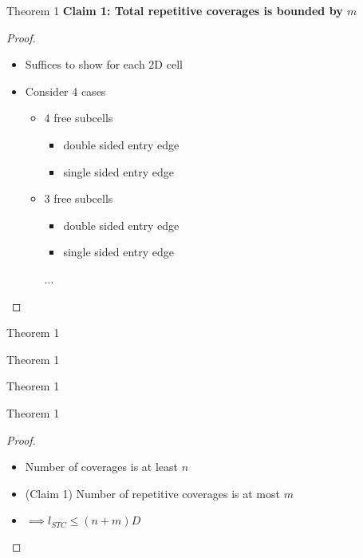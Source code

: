 \documentclass{beamer}
\begin{document}
\begin{frame}{Theorem 1}
    \textbf{Claim 1: Total repetitive coverages is bounded by $m$}
    \begin{proof}
        \begin{itemize}
            \item Suffices to show for each 2D cell
            \item Consider 4 cases
                  \begin{itemize}
                      \item 4 free subcells
                            \begin{itemize}
                                \item double sided entry edge
                                \item single sided entry edge
                            \end{itemize}
                      \item 3 free subcells
                            \begin{itemize}
                                \item double sided entry edge
                                \item single sided entry edge
                            \end{itemize}
                            ...
                  \end{itemize}
        \end{itemize}
    \end{proof}
\end{frame}

\begin{frame}{Theorem 1}
\end{frame}
\begin{frame}{Theorem 1}
\end{frame}
\begin{frame}{Theorem 1}
\end{frame}

\begin{frame}{Theorem 1}
    \begin{proof}
        \begin{itemize}
            \item Number of coverages is at least $n$
            \item (Claim 1) Number of repetitive coverages is at most $m$
            \item $\implies l_{STC} \leq (n+m) D$
        \end{itemize}
    \end{proof}
\end{frame}
\end{document}
